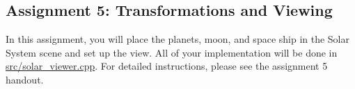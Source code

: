 \subsection*{Assignment 5\+: Transformations and Viewing }

In this assignment, you will place the planets, moon, and space ship in the Solar System scene and set up the view. All of your implementation will be done in {\ttfamily \hyperlink{solar__viewer_8cpp}{src/solar\+\_\+viewer.\+cpp}}. For detailed instructions, please see the assignment 5 handout. 